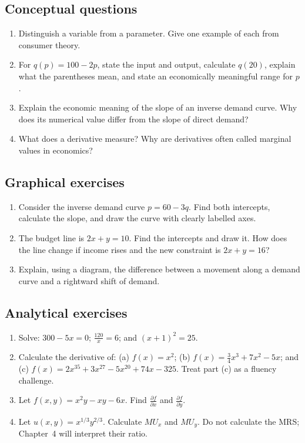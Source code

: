 \subsection*{Conceptual questions}
\begin{enumerate}[label=\arabic*.]
  \item Distinguish a variable from a parameter. Give one example of each from consumer theory.
  \item For $q(p)=100-2p$, state the input and output, calculate $q(20)$, explain what the parentheses mean, and state an economically meaningful range for $p$.
  \item Explain the economic meaning of the slope of an inverse demand curve. Why does its numerical value differ from the slope of direct demand?
  \item What does a derivative measure? Why are derivatives often called marginal values in economics?
\end{enumerate}

\subsection*{Graphical exercises}
\begin{enumerate}[resume,label=\arabic*.]
  \item Consider the inverse demand curve $p=60-3q$. Find both intercepts, calculate the slope, and draw the curve with clearly labelled axes.
  \item The budget line is $2x+y=10$. Find the intercepts and draw it. How does the line change if income rises and the new constraint is $2x+y=16$?
  \item Explain, using a diagram, the difference between a movement along a demand curve and a rightward shift of demand.
\end{enumerate}

\subsection*{Analytical exercises}
\begin{enumerate}[resume,label=\arabic*.]
  \item Solve: $300-5x=0$; $\frac{120}{x}=6$; and $(x+1)^2=25$.
  \item Calculate the derivative of: (a) $f(x)=x^2$; (b) $f(x)=\frac{3}{4}x^3+7x^2-5x$; and (c) $f(x)=2x^{35}+3x^{27}-5x^{20}+74x-325$. Treat part (c) as a fluency challenge.
  \item Let $f(x,y)=x^2y-xy-6x$. Find $\frac{\partial f}{\partial x}$ and $\frac{\partial f}{\partial y}$.
  \item Let $u(x,y)=x^{1/3}y^{2/3}$. Calculate $MU_x$ and $MU_y$. Do not calculate the MRS; Chapter~4 will interpret their ratio.
\end{enumerate}

